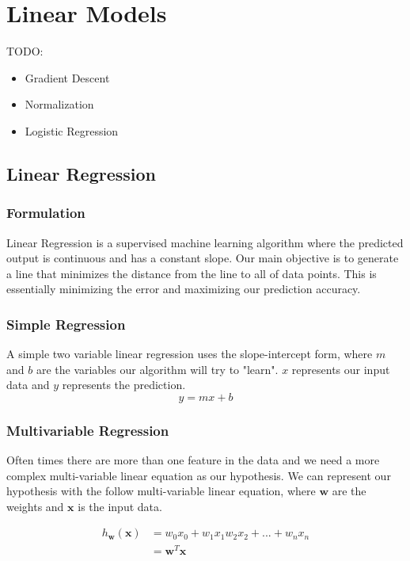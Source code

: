 \documentclass[12pt]{article}
\begin{document}
\section{Linear Models}
    TODO:
    \begin{itemize}
        \item Gradient Descent
        \item Normalization
        \item Logistic Regression
    \end{itemize}

    \subsection{Linear Regression}
    \subsubsection{Formulation}
        Linear Regression is a supervised machine learning algorithm where the predicted output is continuous and has a constant slope. Our main objective is to generate a line that
        minimizes the distance from the line to all of data points. This is essentially minimizing the error and maximizing our prediction accuracy.
    
    \subsubsection{Simple Regression}
        A simple two variable linear regression uses the slope-intercept form, where $m$ and $b$ are the variables our algorithm will try to "learn". $x$ represents our input data
        and $y$ represents the prediction.
        $$ y = mx + b$$

    \subsubsection{Multivariable Regression}
        Often times there are more than one feature in the data and we need a more complex multi-variable linear equation as our hypothesis. We can represent our hypothesis with the
        follow multi-variable linear equation, where $\boldsymbol{w}$ are the weights and $\boldsymbol{x}$ is the input data.

        \begin{align*}
            h_{\boldsymbol{w}}(\boldsymbol{x}) &= w_0x_0 + w_1x_1 w_2x_2 + ... + w_nx_n \\
            &= \boldsymbol{w}^T\boldsymbol{x}
        \end{align*}
\end{document}
